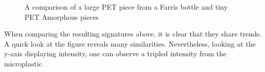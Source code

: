 \begin{figure}[H]
  \newcommand*\FigVSkip{0.5em}
  \newcommand*\FigHSkip{0.1em}
  \newsavebox\FigBox
  \centering
  \begin{minipage}{\wd\FigBox}
    \centering\usebox{\FigBox}
  \end{minipage}
  \begin{minipage}{\wd\FigBox}
    \centering\usebox{\FigBox}
  \end{minipage}
  \caption{A comparison of a large PET piece from a Farris bottle and tiny PET Amorphous pieces}
  \label{fig:size}
\end{figure}
\noindent
When comparing the resulting signatures above, it is clear that they share trends. A quick look at the figure reveals many similarities. Nevertheless, looking at the y-axis displaying intensity, one can observe a tripled intensity from the microplastic. 